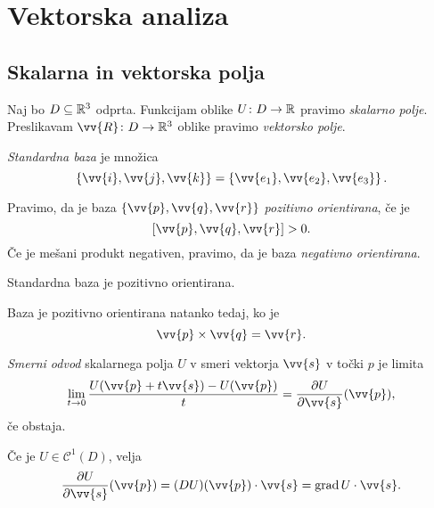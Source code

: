 \section{Vektorska analiza}

\subsection{Skalarna in vektorska polja}

\begin{definicija}
Naj bo $D \subseteq \mathbb{R}^3$ odprta. Funkcijam oblike
$U \colon D \to \mathbb{R}$ pravimo
\emph{skalarno polje}. Preslikavam
$\vv{R} \colon D \to \R^3$ oblike pravimo \emph{vektorsko polje}.
\end{definicija}

\begin{definicija}
\emph{Standardna baza} je množica
\[
\set{\vv{i}, \vv{j}, \vv{k}} = \set{\vv{e_1}, \vv{e_2}, \vv{e_3}}.
\]
\end{definicija}

\begin{definicija}
Pravimo, da je baza $\set{\vv{p}, \vv{q}, \vv{r}}$
\emph{pozitivno orientirana}, če je
\[
[\vv{p}, \vv{q}, \vv{r}] > 0.
\]
Če je mešani produkt negativen, pravimo, da je baza
\emph{negativno orientirana}.
\end{definicija}

\begin{opomba}
Standardna baza je pozitivno orientirana.
\end{opomba}

\begin{opomba}
Baza je pozitivno orientirana natanko tedaj, ko je
\[
\vv{p} \times \vv{q} = \vv{r}.
\]
\end{opomba}


\begin{definicija}
\emph{Smerni odvod} skalarnega polja
$U$ v smeri vektorja $\vv{s}$ v točki $p$ je limita
\[
\lim_{t \to 0}
\frac{U(\vv{p} + t \vv{s}) - U(\vv{p})}{t} =
\frac{\partial U}{\partial \vv{s}}(\vv{p}),
\]
če obstaja.
\end{definicija}

\begin{opomba}
Če je $U \in \mathcal{C}^1(D)$, velja
\[
\frac{\partial U}{\partial \vv{s}}(\vv{p}) =
(DU)(\vv{p}) \cdot \vv{s} =
\grad U \cdot \vv{s}.
\]
\end{opomba}

